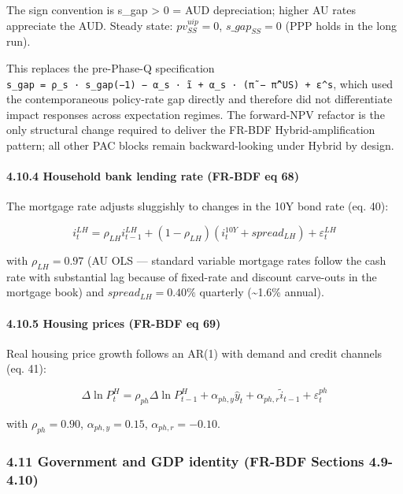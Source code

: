 \documentclass[
]{article}
\begin{document}
The sign convention is s\_gap \textgreater{} 0 = AUD depreciation;
higher AU rates appreciate the AUD. Steady state: \(pv^{uip}_{SS} = 0\),
\(s\_gap_{SS} = 0\) (PPP holds in the long run).

This replaces the pre-Phase-Q specification
\texttt{s\_gap\ =\ ρ\_s\ ·\ s\_gap(−1)\ −\ α\_s\ ·\ ĩ\ +\ α\_s\ ·\ (π̃\ −\ π̃\^{}US)\ +\ ε\^{}s},
which used the contemporaneous policy-rate gap directly and therefore
did not differentiate impact responses across expectation regimes. The
forward-NPV refactor is the only structural change required to deliver
the FR-BDF Hybrid-amplification pattern; all other PAC blocks remain
backward-looking under Hybrid by design.

\paragraph{4.10.4 Household bank lending rate (FR-BDF eq
68)}\label{household-bank-lending-rate-fr-bdf-eq-68}

The mortgage rate adjusts sluggishly to changes in the 10Y bond rate
(eq. 40):

\[i^{LH}_t = \rho_{LH} i^{LH}_{t-1} + (1 - \rho_{LH})(i^{10Y}_t + spread_{LH}) + \varepsilon^{LH}_t\]

with \(\rho_{LH} = 0.97\) (AU OLS --- standard variable mortgage rates
follow the cash rate with substantial lag because of fixed-rate and
discount carve-outs in the mortgage book) and \(spread_{LH} = 0.40\%\)
quarterly (\textasciitilde1.6\% annual).

\paragraph{4.10.5 Housing prices (FR-BDF eq
69)}\label{housing-prices-fr-bdf-eq-69}

Real housing price growth follows an AR(1) with demand and credit
channels (eq. 41):

\[\Delta \ln P^H_t = \rho_{ph} \Delta \ln P^H_{t-1} + \alpha_{ph,y} \hat{y}_t + \alpha_{ph,r} \tilde{i}_{t-1} + \varepsilon^{ph}_t\]

with \(\rho_{ph} = 0.90\), \(\alpha_{ph,y} = 0.15\),
\(\alpha_{ph,r} = -0.10\).

\subsubsection{4.11 Government and GDP identity (FR-BDF Sections
4.9-4.10)}\label{government-and-gdp-identity-fr-bdf-sections-4.9-4.10}
\end{document}
